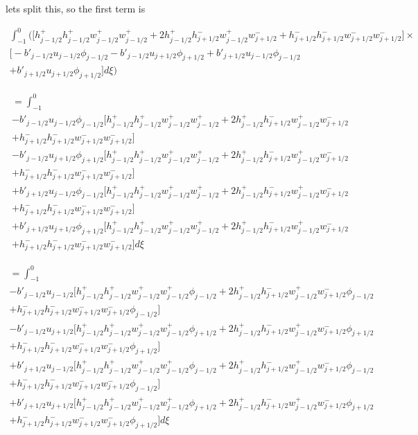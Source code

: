 \documentclass[12pt]{article}
\begin{document}
lets split this, so the first term is

\begin{multline}
\int_{-1}^{0}
\bigg(\bigg[ h^+_{j-1/2}h^+_{j-1/2} w^+_{j-1/2}w^+_{j-1/2}  + 2h^+_{j-1/2}h^-_{j+1/2} w^+_{j-1/2} w^-_{j+1/2} + h^-_{j+1/2}h^-_{j+1/2} w^-_{j+1/2}w^-_{j+1/2}\bigg] \times \\\big[-b'_{j-1/2}u_{j-1/2}\phi_{j-1/2} - b'_{j-1/2}u_{j+1/2} \phi_{j+1/2}  + b'_{j+1/2} u_{j-1/2} \phi_{j-1/2} \\+ b'_{j+1/2}u_{j+1/2} \phi_{j+1/2}  \big] d\xi \bigg)
\end{multline}




\begin{multline}
=\int_{-1}^{0}\\
-b'_{j-1/2}u_{j-1/2}\phi_{j-1/2}\bigg[ h^+_{j-1/2}h^+_{j-1/2} w^+_{j-1/2}w^+_{j-1/2}  + 2h^+_{j-1/2}h^-_{j+1/2} w^+_{j-1/2} w^-_{j+1/2}\\ + h^-_{j+1/2}h^-_{j+1/2} w^-_{j+1/2}w^-_{j+1/2}\bigg] \\- b'_{j-1/2}u_{j+1/2} \phi_{j+1/2}\bigg[ h^+_{j-1/2}h^+_{j-1/2} w^+_{j-1/2}w^+_{j-1/2}  + 2h^+_{j-1/2}h^-_{j+1/2} w^+_{j-1/2} w^-_{j+1/2} \\+ h^-_{j+1/2}h^-_{j+1/2} w^-_{j+1/2}w^-_{j+1/2}\bigg] \\+ b'_{j+1/2} u_{j-1/2} \phi_{j-1/2}\bigg[ h^+_{j-1/2}h^+_{j-1/2} w^+_{j-1/2}w^+_{j-1/2}  + 2h^+_{j-1/2}h^-_{j+1/2} w^+_{j-1/2} w^-_{j+1/2} \\+ h^-_{j+1/2}h^-_{j+1/2} w^-_{j+1/2}w^-_{j+1/2}\bigg] \\+ b'_{j+1/2}u_{j+1/2} \phi_{j+1/2} \bigg[ h^+_{j-1/2}h^+_{j-1/2} w^+_{j-1/2}w^+_{j-1/2}  + 2h^+_{j-1/2}h^-_{j+1/2} w^+_{j-1/2} w^-_{j+1/2} \\+ h^-_{j+1/2}h^-_{j+1/2} w^-_{j+1/2}w^-_{j+1/2}\bigg] d\xi
\end{multline}

\begin{multline}
=\int_{-1}^{0}\\
-b'_{j-1/2}u_{j-1/2}\bigg[ h^+_{j-1/2}h^+_{j-1/2} w^+_{j-1/2}w^+_{j-1/2}\phi_{j-1/2}  + 2h^+_{j-1/2}h^-_{j+1/2} w^+_{j-1/2} w^-_{j+1/2}\phi_{j-1/2}\\ + h^-_{j+1/2}h^-_{j+1/2} w^-_{j+1/2}w^-_{j+1/2}\phi_{j-1/2}\bigg] \\- b'_{j-1/2}u_{j+1/2} \bigg[ h^+_{j-1/2}h^+_{j-1/2} w^+_{j-1/2}w^+_{j-1/2}\phi_{j+1/2}  + 2h^+_{j-1/2}h^-_{j+1/2} w^+_{j-1/2} w^-_{j+1/2}\phi_{j+1/2} \\+ h^-_{j+1/2}h^-_{j+1/2} w^-_{j+1/2}w^-_{j+1/2}\phi_{j+1/2}\bigg] \\+ b'_{j+1/2} u_{j-1/2} \bigg[ h^+_{j-1/2}h^+_{j-1/2} w^+_{j-1/2}w^+_{j-1/2}\phi_{j-1/2}  + 2h^+_{j-1/2}h^-_{j+1/2} w^+_{j-1/2} w^-_{j+1/2}\phi_{j-1/2} \\+ h^-_{j+1/2}h^-_{j+1/2} w^-_{j+1/2}w^-_{j+1/2}\phi_{j-1/2}\bigg] \\+ b'_{j+1/2}u_{j+1/2}  \bigg[ h^+_{j-1/2}h^+_{j-1/2} w^+_{j-1/2}w^+_{j-1/2}\phi_{j+1/2}  + 2h^+_{j-1/2}h^-_{j+1/2} w^+_{j-1/2} w^-_{j+1/2}\phi_{j+1/2} \\+ h^-_{j+1/2}h^-_{j+1/2} w^-_{j+1/2}w^-_{j+1/2}\phi_{j+1/2}\bigg] d\xi
\end{multline}
\end{document}
